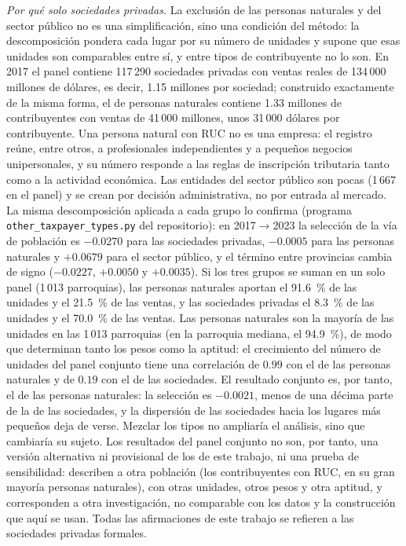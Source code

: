\documentclass[12pt,a4paper]{article}
\begin{document}
\par\vspace{6pt}
\textit{Por qué solo sociedades privadas.} La exclusión de las personas naturales y del sector público no es una simplificación, sino una condición del método: la descomposición pondera cada lugar por su número de unidades y supone que esas unidades son comparables entre sí, y entre tipos de contribuyente no lo son. En 2017 el panel contiene 117\,290 sociedades privadas con ventas reales de 134\,000 millones de dólares, es decir, 1.15 millones por sociedad; construido exactamente de la misma forma, el de personas naturales contiene 1.33 millones de contribuyentes con ventas de 41\,000 millones, unos 31\,000 dólares por contribuyente. Una persona natural con RUC no es una empresa: el registro reúne, entre otros, a profesionales independientes y a pequeños negocios unipersonales, y su número responde a las reglas de inscripción tributaria tanto como a la actividad económica. Las entidades del sector público son pocas (1\,667 en el panel) y se crean por decisión administrativa, no por entrada al mercado. La misma descomposición aplicada a cada grupo lo confirma (programa \texttt{other\_taxpayer\_types.py} del repositorio): en 2017$\to$2023 la selección de la vía de población es $-0.0270$ para las sociedades privadas, $-0.0005$ para las personas naturales y $+0.0679$ para el sector público, y el término entre provincias cambia de signo ($-0.0227$, $+0.0050$ y $+0.0035$). Si los tres grupos se suman en un solo panel (1\,013 parroquias), las personas naturales aportan el 91.6~\% de las unidades y el 21.5~\% de las ventas, y las sociedades privadas el 8.3~\% de las unidades y el 70.0~\% de las ventas. Las personas naturales son la mayoría de las unidades en las 1\,013 parroquias (en la parroquia mediana, el 94.9~\%), de modo que determinan tanto los pesos como la aptitud: el crecimiento del número de unidades del panel conjunto tiene una correlación de $0.99$ con el de las personas naturales y de $0.19$ con el de las sociedades. El resultado conjunto es, por tanto, el de las personas naturales: la selección es $-0.0021$, menos de una décima parte de la de las sociedades, y la dispersión de las sociedades hacia los lugares más pequeños deja de verse. Mezclar los tipos no ampliaría el análisis, sino que cambiaría su sujeto. Los resultados del panel conjunto no son, por tanto, una versión alternativa ni provisional de los de este trabajo, ni una prueba de sensibilidad: describen a otra población (los contribuyentes con RUC, en su gran mayoría personas naturales), con otras unidades, otros pesos y otra aptitud, y corresponden a otra investigación, no comparable con los datos y la construcción que aquí se usan. Todas las afirmaciones de este trabajo se refieren a las sociedades privadas formales.
\end{document}
